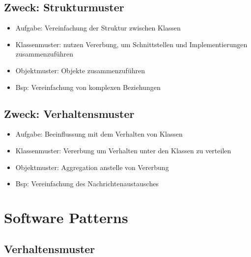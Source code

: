 \documentclass[11pt, fleqn, a4paper, leqno]{scrartcl} %
\begin{document}
		\subsection{Zweck: Strukturmuster}
			\begin{itemize}
				\item Aufgabe: Vereinfachung der Struktur zwischen Klassen
				\item Klassenmuster: nutzen Vererbung, um Schnittstellen und Implementierungen zusammenzuführen
				\item Objektmuster: Objekte zusammenzuführen
				\item Bsp: Vereinfachung von komplexen Beziehungen		
			\end{itemize}
		\subsection{Zweck: Verhaltensmuster}
			\begin{itemize}
				\item Aufgabe: Beeinflussung mit dem Verhalten von Klassen
				\item Klassenmuster: Vererbung um Verhalten unter den Klassen zu verteilen
				\item Objektmuster: Aggregation anstelle von Vererbung
				\item Bsp: Vereinfachung des Nachrichtenaustausches
			\end{itemize}
	\newpage
	\section{Software Patterns}
		\subsection{Verhaltensmuster}
\end{document}
